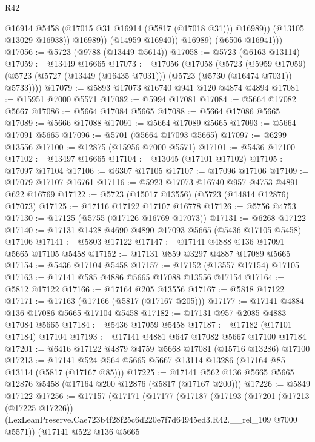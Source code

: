 \begin{lexlean}{R42}
\begin{coremodule}
                      @16914
                      @5458
                      (@17015 @31 @16914 (@5817 (@17018 @31)))
                      @16989))
                  (@13105 @13029 @16938))
                @16989))
            (@14959 @16940))
          @16989)
        (@6506 @16941)))
@17056 := @5723 (@9788 (@13449 @5614))
@17058 := @5723 (@6163 @13114)
@17059 := @13449 @16665
@17073 := @17056
    (@17058
      (@5723
        (@5959 @17059)
        (@5723 (@5727 (@13449 (@16435 @7031))) (@5723 (@5730 (@16474 @7031)) @5733))))
@17079 := @5893 @17073 @16740 @941 @120 @4874 @4894
@17081 := @15951 @7000 @5571
@17082 := @5994 @17081
@17084 := @5664 @17082 @5667
@17086 := @5664 @17084 @5665
@17088 := @5664 @17086 @5665
@17089 := @5666 @17088
@17091 := @5664 @17089 @5665
@17093 := @5664 @17091 @5665
@17096 := @5701 (@5664 @17093 @5665)
@17097 := @6299 @13556
@17100 := @12875 (@15956 @7000 @5571)
@17101 := @5436 @17100
@17102 := @13497 @16665
@17104 := @13045 (@17101 @17102)
@17105 := @17097 @17104
@17106 := @6307 @17105
@17107 := @17096 @17106
@17109 := @17079 @17107 @16761
@17116 := @5923 @17073 @16740 @957 @4753 @4891 @622 @16769
@17122 := @5723 (@15017 @13556) (@5723 (@14814 @12876) @17073)
@17125 := @17116 @17122 @17107 @16778
@17126 := @5756 @4753
@17130 := @17125 (@5755 (@17126 @16769 @17073))
@17131 := @6268 @17122
@17140 := @17131 @1428 @4690 @4890 @17093 @5665 (@5436 @17105 @5458) @17106
@17141 := @5803 @17122
@17147 := @17141 @4888 @136 @17091 @5665 @17105 @5458
@17152 := @17131 @859 @3297 @4887 @17089 @5665
@17154 := @5436 @17104 @5458
@17157 := @17152 (@13557 @17154) @17105
@17163 := @17141 @585 @4886 @5665 @17088 @13556 @17154
@17164 := @5812 @17122
@17166 := @17164 @205 @13556
@17167 := @5818 @17122
@17171 := @17163 (@17166 (@5817 (@17167 @205)))
@17177 := @17141 @4884 @136 @17086 @5665 @17104 @5458
@17182 := @17131 @957 @2085 @4883 @17084 @5665
@17184 := @5436 @17059 @5458
@17187 := @17182 (@17101 @17184) @17104
@17193 := @17141 @4881 @647 @17082 @5667 @17100 @17184
@17201 := @6416 @17122 @4879 @4759 @5668 @17081 (@15716 @13286) @17100
@17213 := @17141 @524 @564 @5665 @5667 @13114 @13286 (@17164 @85 @13114 (@5817 (@17167 @85)))
@17225 := @17141 @562 @136 @5665 @5665 @12876 @5458 (@17164 @200 @12876 (@5817 (@17167 @200)))
@17226 := @5849 @17122
@17256 := @17157
    (@17171
      (@17177
        (@17187
          (@17193
            (@17201
              (@17213 (@17225 @17226))
              (LexLeanPreserve.Cae723b4f28f25c6d220e7f7d64945ed3.R42.__rel_109 @7000 @5571))
            (@17141
              @522
              @136
              @5665

\end{coremodule}
\end{lexlean}
